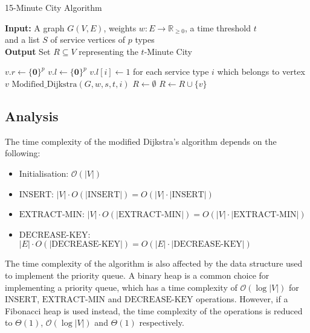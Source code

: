 \begin{algorithm}[H]
    \caption{15-Minute City Algorithm}\label{alg:15mc}
    \textbf{Input:} A graph $G(V,E)$, weights $w:E\rightarrow\mathbb{R}_{\geq 0}$, a time threshold $t$ \\  and a list $S$ of service vertices of $p$ types\\
    \textbf{Output} Set $R\subseteq V$ representing the $t$-Minute City
    \begin{algorithmic}
            \State $v.r \gets \{\mathbf{0}\}^{p}$
            \State $v.l \gets \{\mathbf{0}\}^{p}$
        \EndFor
            \State $v.l[i] \gets 1$ for each service type $i$ which belongs to vertex $v$
        \EndFor
                \State $\text{Modified\_Dijkstra}(G,w,s,t,i)$
            \EndFor
        \EndFor
        \State $R\gets\emptyset$
                \State $R \gets R\cup \{v\}$
            \EndIf
        \EndFor
    \end{algorithmic}
\end{algorithm}

\subsection{Analysis}

The time complexity of the modified Dijkstra's algorithm depends on the following:

\begin{itemize}
    \item Initialisation: $\mathcal{O}(|V|)$
    \item $\text{INSERT}$: $|V|\cdot O(|\text{INSERT}|)=O(|V|\cdot|\text{INSERT}|)$
    \item $\text{EXTRACT-MIN}$: $|V|\cdot O(|\text{EXTRACT-MIN}|)=O(|V|\cdot|\text{EXTRACT-MIN}|)$
    \item $\text{DECREASE-KEY}$: $|E|\cdot O(|\text{DECREASE-KEY}|)=O(|E|\cdot|\text{DECREASE-KEY}|)$
\end{itemize}

The time complexity of the algorithm is also affected by the data structure used to implement the priority queue. A binary heap is a common choice for implementing a priority queue, which has a time complexity of $\mathcal{O}(\log |V|)$ for $\text{INSERT}$, $\text{EXTRACT-MIN}$ and $\text{DECREASE-KEY}$ operations. However, if a Fibonacci heap is used instead, the time complexity of the operations is reduced to $\Theta(1)$, $\mathcal{O}(\log |V|)$ and $\Theta(1)$ respectively.


